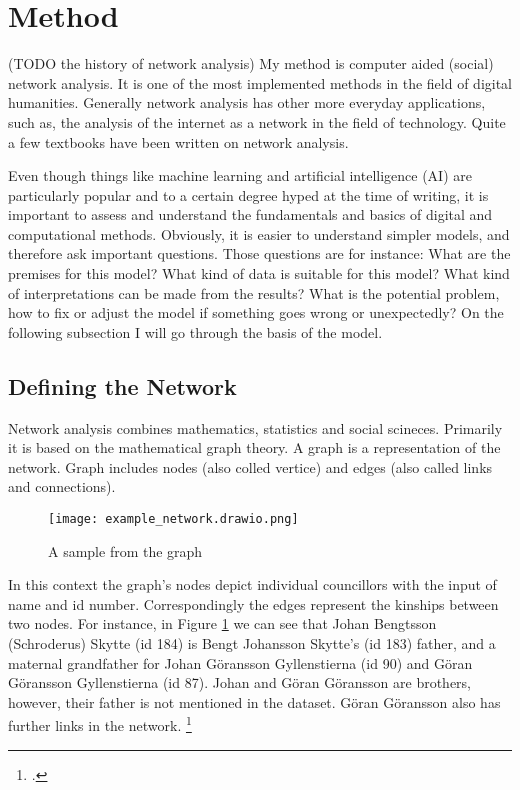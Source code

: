 \section{Method}
\label{method}

(TODO the history of network analysis)
My method is computer aided (social) network analysis. It is one of the most implemented methods in the field of digital humanities. Generally network analysis has other more everyday applications, such as, the analysis of the internet as a network in the field of technology. Quite a few textbooks have been written on network analysis.
 

Even though things like machine learning and artificial intelligence (AI) are particularly popular and to a certain degree hyped at the time of writing, it is important to assess and understand the fundamentals and basics of digital and computational methods. Obviously, it is easier to understand simpler models, and therefore ask important questions. Those questions are for instance: What are the premises for this model? What kind of data is suitable for this model? What kind of interpretations can be made from the results? What is the potential problem, how to fix or adjust the model if something goes wrong or unexpectedly? On the following subsection I will go through the basis of the model.

\subsection{Defining the Network}
\label{network}
Network analysis combines mathematics, statistics and social scineces. Primarily it is based on the mathematical graph theory. A graph is a representation of the network. Graph includes nodes (also colled vertice) and edges (also called links and connections).

\begin{figure}
	\texttt{[image: example\_network.drawio.png]}
	\centering
	\caption{A sample from the graph} 
	\centering
	\label{samplegraph}
\end{figure}
In this context the graph's nodes depict individual councillors with the input of name and id number. Correspondingly the edges represent the kinships between two nodes. For instance, in Figure \ref{samplegraph} we can see that Johan Bengtsson (Schroderus) Skytte (id 184) is Bengt Johansson Skytte's (id 183) father, and a maternal grandfather for Johan Göransson Gyllenstierna (id 90) and Göran Göransson Gyllenstierna (id 87). Johan and Göran Göransson are brothers, however, their father is not mentioned in the dataset. Göran Göransson also has further links in the network. \footcite{councillorsDS}

